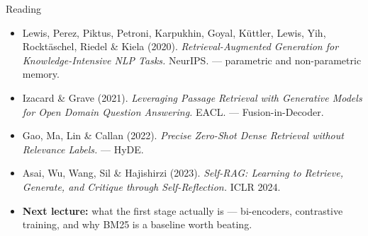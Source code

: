 \begin{frame}{Reading}
\begin{itemize}
  \item Lewis, Perez, Piktus, Petroni, Karpukhin, Goyal, K\"uttler, Lewis, Yih, Rockt\"aschel, Riedel \& Kiela (2020). \textit{Retrieval-Augmented Generation for Knowledge-Intensive NLP Tasks.} NeurIPS. --- parametric and non-parametric memory.
  \pause
  \item Izacard \& Grave (2021). \textit{Leveraging Passage Retrieval with Generative Models for Open Domain Question Answering.} EACL. --- Fusion-in-Decoder.
  \pause
  \item Gao, Ma, Lin \& Callan (2022). \textit{Precise Zero-Shot Dense Retrieval without Relevance Labels.} --- HyDE.
  \pause
  \item Asai, Wu, Wang, Sil \& Hajishirzi (2023). \textit{Self-RAG: Learning to Retrieve, Generate, and Critique through Self-Reflection.} ICLR 2024.
  \pause
  \item \textbf{Next lecture:} what the first stage actually is --- bi-encoders, contrastive training, and why BM25 is a baseline worth beating.
\end{itemize}
\end{frame}
